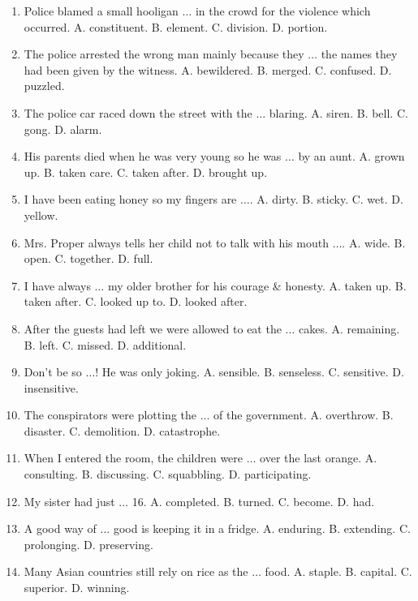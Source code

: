 \documentclass{article}
\numberwithin{equation}{section}
\begin{document}
\begin{enumerate}[leftmargin=2mm]
	\item Police blamed a small hooligan $\ldots$ in the crowd for the violence which occurred. {\sf A.} constituent. {\sf B.} element. {\sf C.} division. {\sf D.} portion.
	\item The police arrested the wrong man mainly because they $\ldots$ the names they had been given by the witness. {\sf A.} bewildered. {\sf B.} merged. {\sf C.} confused. {\sf D.} puzzled.
	\item The police car raced down the street with the $\ldots$ blaring. {\sf A.} siren. {\sf B.} bell. {\sf C.} gong. {\sf D.} alarm.
	\item His parents died when he was very young so he was $\ldots$ by an aunt. {\sf A.} grown up. {\sf B.} taken care. {\sf C.} taken after. {\sf D.} brought up.
	\item I have been eating honey so my fingers are $\ldots$. {\sf A.} dirty. {\sf B.} sticky. {\sf C.} wet. {\sf D.} yellow.
	\item Mrs. Proper always tells her child not to talk with his mouth $\ldots$. {\sf A.} wide. {\sf B.} open. {\sf C.} together. {\sf D.} full.
	\item I have always $\ldots$ my older brother for his courage \& honesty. {\sf A.} taken up. {\sf B.} taken after. {\sf C.} looked up to. {\sf D.} looked after.
	\item After the guests had left we were allowed to eat the $\ldots$ cakes. {\sf A.} remaining. {\sf B.} left. {\sf C.} missed. {\sf D.} additional.
	\item Don't be so $\ldots$! He was only joking. {\sf A.} sensible. {\sf B.} senseless. {\sf C.} sensitive. {\sf D.} insensitive.
	\item The conspirators were plotting the $\ldots$ of the government. {\sf A.} overthrow. {\sf B.} disaster. {\sf C.} demolition. {\sf D.} catastrophe.
	\item When I entered the room, the children were $\ldots$ over the last orange. {\sf A.} consulting. {\sf B.} discussing. {\sf C.} squabbling. {\sf D.} participating.
	\item My sister had just $\ldots$ 16. {\sf A.} completed. {\sf B.} turned. {\sf C.} become. {\sf D.} had.
	\item A good way of $\ldots$ good is keeping it in a fridge. {\sf A.} enduring. {\sf B.} extending. {\sf C.} prolonging. {\sf D.} preserving.
	\item Many Asian countries still rely on rice as the $\ldots$ food. {\sf A.} staple. {\sf B.} capital. {\sf C.} superior. {\sf D.} winning.

\end{enumerate}
\end{document}
